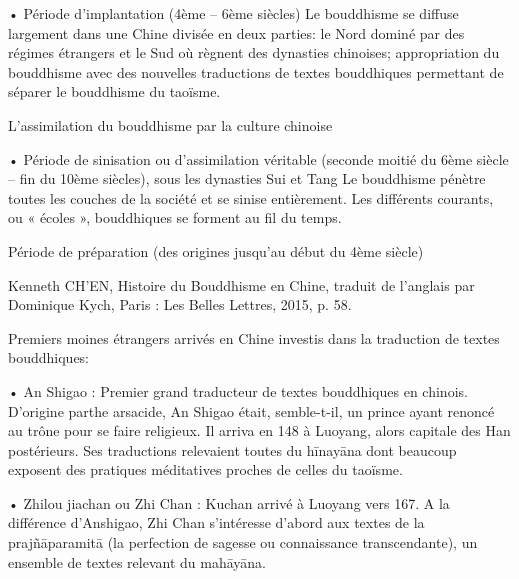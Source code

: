•	Période d’implantation (4ème – 6ème siècles)
Le bouddhisme se diffuse largement dans une Chine divisée en deux parties: le Nord dominé par des régimes étrangers et le Sud où règnent des dynasties chinoises; appropriation du bouddhisme avec des nouvelles traductions de textes bouddhiques permettant de séparer le bouddhisme du taoïsme.
 
L’assimilation du bouddhisme par la culture chinoise



•	Période de sinisation ou d’assimilation véritable (seconde moitié du 6ème siècle – fin du 10ème siècles), sous les dynasties Sui et Tang
Le bouddhisme pénètre toutes les couches de la société et se sinise entièrement. Les différents courants, ou « écoles », bouddhiques se forment au fil du temps.
 
Période de préparation (des origines jusqu’au début du 4ème siècle)
































Kenneth CH’EN, Histoire du Bouddhisme en Chine, traduit de l’anglais par Dominique Kych, Paris : Les Belles Lettres, 2015, p. 58.
 
Premiers moines étrangers arrivés en Chine investis dans la traduction de textes bouddhiques:

•	An Shigao   : Premier grand traducteur de textes bouddhiques en chinois. D’origine parthe arsacide, An Shigao était, semble-t-il, un prince ayant renoncé au trône pour se faire religieux. Il arriva en 148 à Luoyang, alors capitale des Han postérieurs.
Ses traductions relevaient toutes du hīnayāna dont beaucoup exposent des pratiques méditatives proches de celles du taoïsme.

•	Zhilou jiachan     ou Zhi Chan   : Kuchan arrivé à Luoyang vers 167. A la différence d’Anshigao, Zhi Chan s’intéresse d’abord aux textes de la prajñāparamitā (la perfection de sagesse ou connaissance transcendante), un ensemble de textes relevant du mahāyāna.
 
